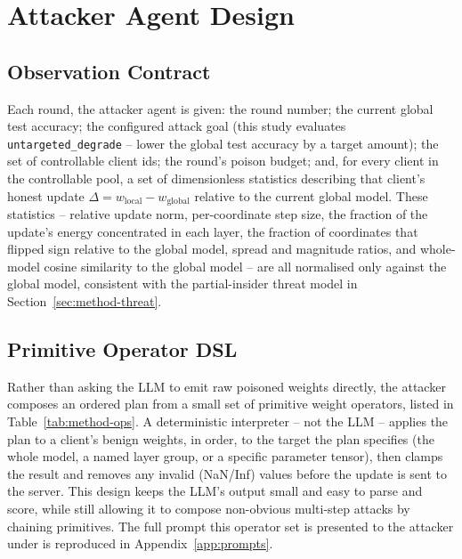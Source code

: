 \section{Attacker Agent Design}
\label{sec:method-attacker}

\subsection{Observation Contract}
Each round, the attacker agent is given: the round number; the current global test accuracy; the configured attack goal (this study evaluates \texttt{untargeted\_degrade} -- lower the global test accuracy by a target amount); the set of controllable client ids; the round's poison budget; and, for every client in the controllable pool, a set of dimensionless statistics describing that client's honest update $\Delta = w_{\text{local}} - w_{\text{global}}$ relative to the current global model. These statistics -- relative update norm, per-coordinate step size, the fraction of the update's energy concentrated in each layer, the fraction of coordinates that flipped sign relative to the global model, spread and magnitude ratios, and whole-model cosine similarity to the global model -- are all normalised only against the global model, consistent with the partial-insider threat model in Section~\ref{sec:method-threat}.

\subsection{Primitive Operator DSL}
Rather than asking the LLM to emit raw poisoned weights directly, the attacker composes an ordered plan from a small set of primitive weight operators, listed in Table~\ref{tab:method-ops}. A deterministic interpreter -- not the LLM -- applies the plan to a client's benign weights, in order, to the target the plan specifies (the whole model, a named layer group, or a specific parameter tensor), then clamps the result and removes any invalid (NaN/Inf) values before the update is sent to the server. This design keeps the LLM's output small and easy to parse and score, while still allowing it to compose non-obvious multi-step attacks by chaining primitives. The full prompt this operator set is presented to the attacker under is reproduced in Appendix~\ref{app:prompts}.

